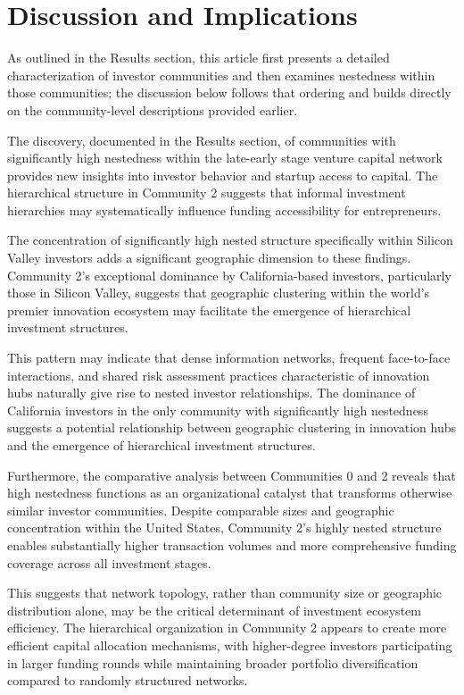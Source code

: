 \section{Discussion and Implications}

As outlined in the Results section, this article first presents a detailed characterization of investor communities and then examines nestedness within those communities; the discussion below follows that ordering and builds directly on the community-level descriptions provided earlier.

The discovery, documented in the Results section, of communities with significantly high nestedness within the late-early stage venture capital network provides new insights into investor behavior and startup access to capital. The hierarchical structure in Community 2 suggests that informal investment hierarchies may systematically influence funding accessibility for entrepreneurs.

The concentration of significantly high nested structure specifically within Silicon Valley investors adds a significant geographic dimension to these findings. Community 2's exceptional dominance by California-based investors, particularly those in Silicon Valley, suggests that geographic clustering within the world's premier innovation ecosystem may facilitate the emergence of hierarchical investment structures. 

This pattern may indicate that dense information networks, frequent face-to-face interactions, and shared risk assessment practices characteristic of innovation hubs naturally give rise to nested investor relationships. The dominance of California investors in the only community with significantly high nestedness suggests a potential relationship between geographic clustering in innovation hubs and the emergence of hierarchical investment structures.

Furthermore, the comparative analysis between Communities 0 and 2 reveals that high nestedness functions as an organizational catalyst that transforms otherwise similar investor communities. Despite comparable sizes and geographic concentration within the United States, Community 2's highly nested structure enables substantially higher transaction volumes and more comprehensive funding coverage across all investment stages. 

This suggests that network topology, rather than community size or geographic distribution alone, may be the critical determinant of investment ecosystem efficiency. The hierarchical organization in Community 2 appears to create more efficient capital allocation mechanisms, with higher-degree investors participating in larger funding rounds while maintaining broader portfolio diversification compared to randomly structured networks.

